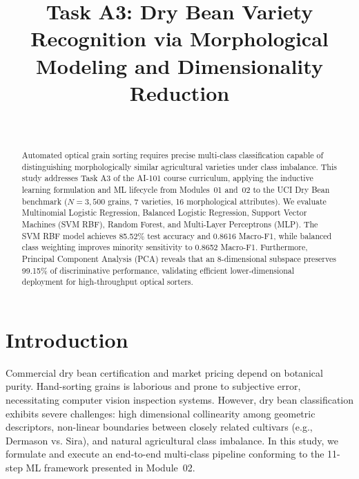 \documentclass[10pt,journal,compsoc,twocolumn]{IEEEtran}
\begin{document}
\title{Task A3: Dry Bean Variety Recognition via Morphological Modeling and Dimensionality Reduction}

\author{
    \\
}

\maketitle

\begin{abstract}
Automated optical grain sorting requires precise multi-class classification capable of distinguishing morphologically similar agricultural varieties under class imbalance. This study addresses Task A3 of the AI-101 course curriculum, applying the inductive learning formulation and ML lifecycle from Modules~01 and~02 to the UCI Dry Bean benchmark ($N = 3,500$ grains, 7 varieties, 16 morphological attributes). We evaluate Multinomial Logistic Regression, Balanced Logistic Regression, Support Vector Machines (SVM RBF), Random Forest, and Multi-Layer Perceptrons (MLP). The SVM RBF model achieves 85.52\% test accuracy and 0.8616 Macro-F1, while balanced class weighting improves minority sensitivity to 0.8652 Macro-F1. Furthermore, Principal Component Analysis (PCA) reveals that an 8-dimensional subspace preserves 99.15\% of discriminative performance, validating efficient lower-dimensional deployment for high-throughput optical sorters.
\end{abstract}

\section{Introduction}
Commercial dry bean certification and market pricing depend on botanical purity. Hand-sorting grains is laborious and prone to subjective error, necessitating computer vision inspection systems. However, dry bean classification exhibits severe challenges: high dimensional collinearity among geometric descriptors, non-linear boundaries between closely related cultivars (e.g., Dermason vs. Sira), and natural agricultural class imbalance. In this study, we formulate and execute an end-to-end multi-class pipeline conforming to the 11-step ML framework presented in Module~02.
\end{document}

